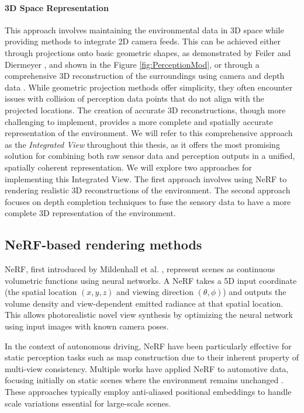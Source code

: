 \paragraph{3D Space Representation} This approach involves maintaining the environmental
data in 3D space while providing methods to integrate 2D camera feeds. This can be
achieved either through projections onto basic geometric shapes, as demonstrated by
Feiler and Diermeyer \cite{Feiler2021ThePM}, and shown in the Figure \ref{fig:PerceptionMod}, or through a comprehensive 3D reconstruction of the surroundings using camera and depth data
. While geometric projection methods offer simplicity, they often encounter issues with collision of perception data points
that do not align with the projected locations. The creation of accurate 3D reconstructions, though more challenging to implement,
provides a more complete and spatially accurate representation of the environment. We will refer to this
comprehensive approach as the \emph{Integrated View} throughout this thesis, as it offers the most promising solution for
combining both raw sensor data and perception outputs in a unified, spatially coherent representation. We will explore
two approaches for implementing this Integrated View. The first approach involves using \ac{NeRF} to rendering
realistic 3D reconstructions of the environment. The second approach focuses on depth completion techniques to fuse the sensory data
to have a more complete 3D representation of the environment.

\subsection{NeRF-based rendering methods}
\ac{NeRF}, first introduced by Mildenhall et al. \cite{mildenhall2020nerf}, represent scenes as continuous volumetric functions using neural networks. A \ac{NeRF} takes a 5D input coordinate (the spatial location $(x,y,z)$ and viewing direction $(\theta,\phi)$) and outputs the volume density and view-dependent emitted radiance at that spatial location. This allows photorealistic novel view synthesis by optimizing the neural network using input images with known camera poses.

In the context of autonomous driving, \ac{NeRF} have been particularly effective for static perception tasks such as map construction due to their inherent property of multi-view consistency. Multiple works have applied \ac{NeRF} to automotive data, focusing initially on static scenes where the environment remains unchanged \cite{snerf2023}. These approaches typically employ anti-aliased positional embeddings to handle scale variations essential for large-scale scenes.

